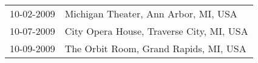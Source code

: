 \begin{supertabular}{ll}
 10-02-2009 &      Michigan Theater, Ann Arbor, MI, USA \\
 10-07-2009 &  City Opera House, Traverse City, MI, USA \\
 10-09-2009 &     The Orbit Room, Grand Rapids, MI, USA \\
\end{supertabular}

